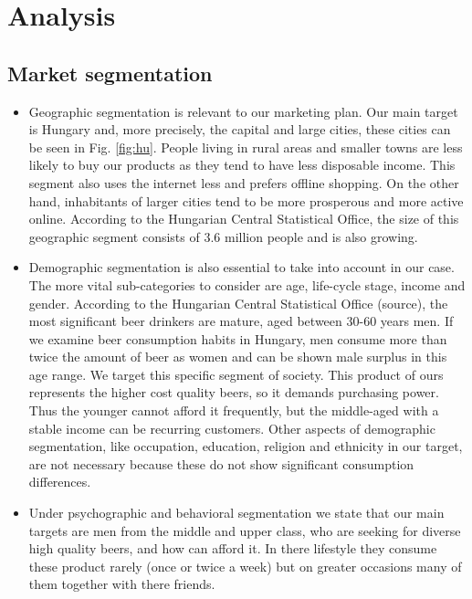 \newpage
\section{Analysis}
\subsection{Market segmentation}

\begin{itemize}
   \item Geographic segmentation is relevant to our marketing plan. Our main target is Hungary and, more precisely, the capital and large cities, these cities can be seen in Fig. \ref{fig:hu}. People living in rural areas and smaller towns are less likely to buy our products as they tend to have less disposable income. This segment also uses the internet less and prefers offline shopping. On the other hand, inhabitants of larger cities tend to be more prosperous and more active online. According to the Hungarian Central Statistical Office, the size of this geographic segment consists of 3.6 million people and is also growing. \cite{ksh1}

   \item Demographic segmentation is also essential to take into account in our case. The more vital sub-categories to consider are age, life-cycle stage, income and gender. According to the Hungarian Central Statistical Office (source), the most significant beer drinkers are mature, aged between 30-60 years men. \cite{ksh2} If we examine beer consumption habits in Hungary, men consume more than twice the amount of beer as women and can be shown male surplus in this age range. We target this specific segment of society. This product of ours represents the higher cost quality beers, so it demands purchasing power. Thus the younger cannot afford it frequently, but the middle-aged with a stable income can be recurring customers. Other aspects of demographic segmentation, like occupation, education, religion and ethnicity in our target, are not necessary because these do not show significant consumption differences.


   \item Under psychographic and behavioral segmentation we state that our main targets are men from the middle and upper class, who are seeking for diverse high quality beers, and how can afford it. In there lifestyle they consume these product rarely (once or twice a week) but on greater occasions many of them together with there friends.
\end{itemize}

